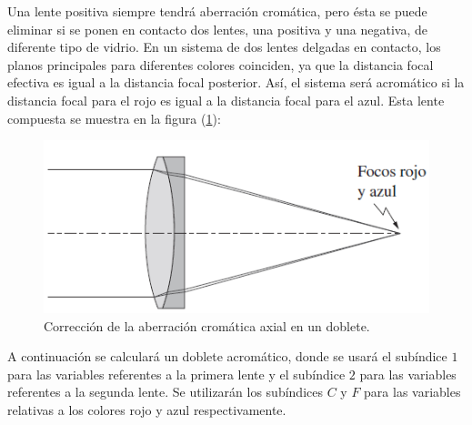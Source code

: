 \documentclass[14pt]{extarticle}
\begin{document}
Una lente positiva siempre tendrá aberración cromática, pero ésta se puede eliminar si se ponen en contacto dos lentes, una positiva y una negativa, de diferente tipo de vidrio. En un sistema de dos lentes delgadas en contacto, los planos principales para diferentes colores coinciden, ya que la distancia focal efectiva es igual a la distancia focal posterior. Así, el sistema será acromático si la distancia focal para el rojo es igual a la distancia focal para el azul. Esta lente compuesta se muestra en la figura (\ref{fig:figura_V_01}):
\begin{figure}[H]
    \centering
    \includegraphics[scale=1]{Imagenes/Aberraciones_01.png}
    \caption{Corrección de la aberración cromática axial en un doblete.}
    \label{fig:figura_V_01}
\end{figure}
A continuación se calculará un doblete acromático, donde se usará el subíndice $1$ para las variables referentes a la primera lente y el subíndice $2$ para las variables referentes a la segunda lente. Se utilizarán los subíndices $C$ y $F$ para las variables relativas a los colores rojo y azul respectivamente.
\end{document}
